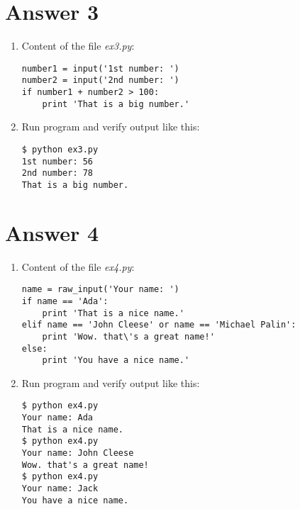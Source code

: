 \documentclass[11pt,a4paper]{article}
\begin{document}
\section*{Answer 3}
\begin{enumerate}
\item Content of the file {\it ex3.py}:
\begin{verbatim}
number1 = input('1st number: ')
number2 = input('2nd number: ')
if number1 + number2 > 100:
    print 'That is a big number.'
\end{verbatim}

\item Run program and verify output like this:
\begin{verbatim}
$ python ex3.py
1st number: 56
2nd number: 78
That is a big number.
\end{verbatim}

\end{enumerate}

\section*{Answer 4}
\begin{enumerate}
\item Content of the file {\it ex4.py}:
\begin{verbatim}
name = raw_input('Your name: ')
if name == 'Ada':
    print 'That is a nice name.'
elif name == 'John Cleese' or name == 'Michael Palin':
    print 'Wow. that\'s a great name!'
else:
    print 'You have a nice name.'
\end{verbatim}

\item Run program and verify output like this:
\begin{verbatim}
$ python ex4.py
Your name: Ada
That is a nice name.
$ python ex4.py
Your name: John Cleese
Wow. that's a great name!
$ python ex4.py
Your name: Jack
You have a nice name.
\end{verbatim}

\end{enumerate}
\end{document}
